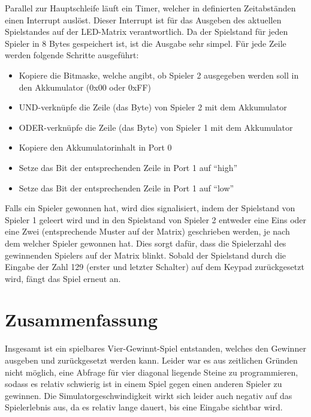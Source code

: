 Parallel zur Hauptschleife läuft ein Timer, welcher in definierten Zeitabständen einen Interrupt auslöst.
Dieser Interrupt ist für das Ausgeben des aktuellen Spielstandes auf der LED-Matrix verantwortlich. 
Da der Spielstand für jeden Spieler in 8 Bytes gespeichert ist, ist die Ausgabe sehr simpel. Für jede Zeile werden folgende Schritte ausgeführt:
\begin{itemize}
	\item Kopiere die Bitmaske, welche angibt, ob Spieler 2 ausgegeben werden soll in den Akkumulator (0x00 oder 0xFF)
	\item UND-verknüpfe die Zeile (das Byte) von Spieler 2 mit dem Akkumulator
	\item ODER-verknüpfe die Zeile (das Byte) von Spieler 1 mit dem Akkumulator
	\item Kopiere den Akkumulatorinhalt in Port 0
	\item Setze das Bit der entsprechenden Zeile in Port 1 auf \enquote{high}
	\item Setze das Bit der entsprechenden Zeile in Port 1 auf \enquote{low}
\end{itemize}

Falls ein Spieler gewonnen hat, wird dies signalisiert, indem der Spielstand von Spieler 1 geleert wird und in den Spielstand von Spieler 2 entweder eine Eins oder eine Zwei (entsprechende Muster auf der Matrix) geschrieben werden, je nach dem welcher Spieler gewonnen hat.
Dies sorgt dafür, dass die Spielerzahl des gewinnenden Spielers auf der Matrix blinkt.
Sobald der Spielstand durch die Eingabe der Zahl 129 (erster und letzter Schalter) auf dem Keypad zurückgesetzt wird, fängt das Spiel erneut an.


\FloatBarrier
\chapter{Zusammenfassung}

Insgesamt ist ein spielbares Vier-Gewinnt-Spiel entstanden, welches den Gewinner ausgeben und zurückgesetzt werden kann.
Leider war es aus zeitlichen Gründen nicht möglich, eine Abfrage für vier diagonal liegende Steine zu programmieren, sodass es relativ schwierig ist in einem Spiel gegen einen anderen Spieler zu gewinnen.
Die Simulatorgeschwindigkeit wirkt sich leider auch negativ auf das Spielerlebnis aus, da es relativ lange dauert, bis eine Eingabe sichtbar wird. 


